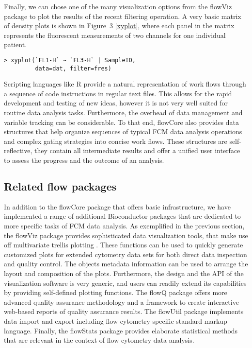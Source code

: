 \documentclass[10pt]{bmc_article}
\newcommand{\Rpackage}[1]{{\textsf{#1}}}
\newenvironment{bmcformat}{\begin{raggedright}\baselineskip20pt\sloppy\setboolean{publ}{false}}{\end{raggedright}\baselineskip20pt\sloppy}
\begin{document}
\begin{bmcformat}
Finally, we can chose one of the many visualization options from the
\Rpackage{flowViz} package to plot the results of the recent filtering
operation. A very basic matrix of density plots is shown in Figure~3
\ref{xyplot}, where each panel in the matrix represents the
fluorescent measurements of two channels for one individual patient.

\begin{verbatim}
> xyplot(`FL1-H` ~ `FL3-H` | SampleID, 
         data=dat, filter=fres)
\end{verbatim}

Scripting languages like R provide a natural representation of work
flows through a sequence of code instructions in regular text
files. This allows for the rapid development and testing of new ideas,
however it is not very well suited for routine data analysis
tasks. Furthermore, the overhead of data management and variable
tracking can be considerable. To that end, \Rpackage{flowCore} also
provides data structures that help organize sequences of typical FCM
data analysis operations and complex gating strategies into concise
work flows. These structures are self-reflective, they contain all
intermediate results and offer a unified user interface to assess the
progress and the outcome of an analysis.

\subsection*{Related flow packages}
In addition to the \Rpackage{flowCore} package that offers basic
infrastructure, we have implemented a range of additional Bioconductor
packages that are dedicated to more specific tasks of FCM data
analysis. As exemplified in the previous section, the
\Rpackage{flowViz} package \cite{sarkar2008ufv} provides sophisticated
data visualization tools, that make use off multivariate trellis
plotting \cite{lattice}.  These functions can be used to quickly
generate customized plots for extended cytometry data sets for both
direct data inspection and quality control.  The objects metadata
information can be used to arrange the layout and composition of the
plots.  Furthermore, the design and the API of the visualization
software is very generic, and users can readily extend its
capabilities by providing self-defined plotting functions.  The
\Rpackage{flowQ} package offers more advanced quality assurance
methodology and a framework to create interactive web-based reports of
quality assurance results. The \Rpackage{flowUtil} package implements
data import and export including flow-cytometry specific standard
markup language. Finally, the \Rpackage{flowStats} package provides
elaborate statistical methods that are relevant in the context of flow
cytometry data analysis.


\end{bmcformat}
\end{document}
